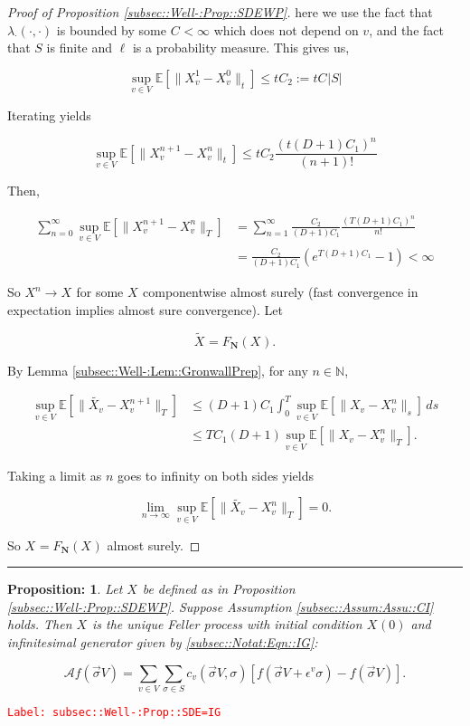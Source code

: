 \documentclass[12pt]{article}
\newcommand{\mb}{\mathbb}
\newcommand{\mc}{\mathcal}
\newcommand{\ra}{\rightarrow}
\newcommand{\ep}{\epsilon}
\newcommand{\tr}{\textcolor{red}}
\newcommand{\labe}[1]{\tr{\texttt{Label: #1}}}
\newcommand{\lin}{\rule{\linewidth}{0.4 pt}}
\newcommand{\ex}[1]{\mb{E}\left[#1\right]}			%
\newcommand{\defeq}{:=}								%
\renewcommand{\v}{v}							%
\renewcommand{\S}{S}							%
\newcommand{\s}{\sigma}							%
\newcommand{\sv}{\vec{\s}}						%
\newcommand{\ev}[1]{\ep^{#1}}					%
\newcommand{\T}{T}								%
\renewcommand{\t}{t}							%
\renewcommand{\tt}{s}							%
\newcommand{\degr}{D}								%
\newcommand{\poisses}{\mathbf{N}}				%
\newcommand{\IG}{\mc{A}}						%
\newcommand{\V}{V}									%
\newcommand{\numb}{n}								%
\newcommand{\XState}[1]{\S^{#1}}				%
\newcommand{\rxvt}[2]{X_{#1}{(#2)}}					%
\newcommand{\rxvts}[2]{X_{#1}{#2}}					%
\newcommand{\rxvtsn}[3]{X_{#1}^{#3}{#2}}			%
\newcommand{\IGr}[1]{c_{#1}}						%
\newcommand{\rate}[1]{\lambda_{#1}}					%
\newcommand{\const}[1]{C_{#1}}						%
\newcommand{\Sm}{\ell}								%
\newcommand{\alt}{\widetilde}						%
\newtheorem{prop}[thms]{Proposition: }
\begin{document}
\begin{proof}[Proof of Proposition \ref{subsec::Well-:Prop::SDEWP}]
here we use the fact that \(\rate{\cdot}(\cdot,\cdot)\) is bounded by some \(\const{} < \infty\) which does not depend on \(\v\), and the fact that \(\S\) is finite and \(\Sm\) is a probability measure. This gives us,

\[\sup_{\v \in \V}\ex{\|\rxvtsn{\v}{}{1} - \rxvtsn{\v}{}{0}\|_\t} \leq \t\const{2} \defeq \t\const{}|\S|\]

Iterating yields

\[\sup_{\v \in \V} \ex{\|\rxvtsn{\v}{}{\numb+1} - \rxvtsn{\v}{}{\numb}\|_\t} \leq \t\const{2}\frac{(\t(\degr+1)\const{1})^\numb}{(\numb+1)!}\]

Then,

\begin{align*}
\sum_{\numb=0}^\infty \sup_{\v \in \V} \ex{\|\rxvtsn{\v}{}{\numb+1} - \rxvtsn{\v}{}{\numb}\|_\T} &= \sum_{\numb=1}^\infty \frac{\const{2}}{(\degr+1)\const{1}}\frac{(\T(\degr+1)\const{1})^{\numb}}{\numb !}\\
& = \frac{\const{2}}{(\degr+1)\const{1}}(e^{\T(\degr+1)\const{1}} - 1) < \infty
\end{align*}


So \(\rxvtsn{}{}{\numb} \ra \rxvts{}{}\) for some \(\rxvts{}{}\) componentwise almost surely (fast convergence in expectation implies almost sure convergence). Let 

\[\alt{\rxvts{}{}} = F_\poisses(\rxvts{}{}).\]

By Lemma \ref{subsec::Well-:Lem::GronwallPrep}, for any \(\numb\in\mb{N}\),

\begin{align*}
\sup_{\v \in \V} \ex{\|\alt{\rxvts{\v}{}} - \rxvtsn{\v}{}{\numb+1}\|_\T} &\leq (\degr+1)\const{1}\int_0^\T \sup_{\v \in \V}\ex{\|\rxvts{\v}{} - \rxvtsn{\v}{}{\numb}\|_\tt}\,d\tt \\
&\leq \T\const{1}(\degr+1)\sup_{\v\in \V} \ex{\|\rxvts{\v}{} - \rxvtsn{\v}{}{\numb}\|_\T}.
\end{align*}

Taking a limit as \(\numb\) goes to infinity on both sides yields

\[\lim_{\numb\ra\infty} \sup_{\v \in \V} \ex{\|\alt{\rxvts{\v}{}} - \rxvtsn{\v}{}{\numb}\|_\T} = 0.\]

So \(\rxvts{}{}= F_\poisses(\rxvts{}{})\) almost surely.
\end{proof}

\lin

\begin{prop}
Let \(\rxvts{}{}\) be defined as in Proposition \ref{subsec::Well-:Prop::SDEWP}. Suppose Assumption \ref{subsec::Assum:Assu::CI} holds. Then \(\rxvts{}{}\) is the unique Feller process with initial condition \(\rxvt{}{0}\) and infinitesimal generator given by \eqref{subsec::Notat:Eqn::IG}:

\[\IG f(\sv{}{\V}) = \sum_{\v\in \V}\sum_{\s \in \S} \IGr{\v}(\sv{}{\V},\s)[f(\sv{}{\V} + \ev{\v}\s) - f(\sv{}{\V})].\]
\label{subsec::Well-:Prop::SDE=IG}
\end{prop}
\labe{subsec::Well-:Prop::SDE=IG}
\end{document}
